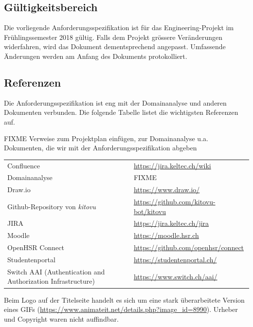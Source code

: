 \documentclass[a4paper]{article}
\def\jiraurl{https://jira.keltec.ch/jira}
\def\confluenceurl{https://jira.keltec.ch/wiki}
\begin{document}
\subsection{Gültigkeitsbereich}
Die vorliegende Anforderungsspezifikation ist für das Engineering-Projekt im Frühlingssemester 2018 gültig. Falls dem Projekt grössere Veränderungen widerfahren, wird das Dokument dementsprechend angepasst. Umfassende Änderungen werden am Anfang des Dokuments protokolliert.

\subsection{Referenzen}


Die Anforderungsspezifikation ist eng mit der Domainanalyse und anderen Dokumenten verbunden. Die folgende Tabelle listet die wichtigsten Referenzen auf.

FIXME Verweise zum Projektplan einfügen, zur Domainanalyse u.a. Dokumenten, die wir mit der Anforderungsspezifikation abgeben

\begin{tabulary}{\linewidth}{ll}
	Confluence & \url{\confluenceurl} \\
	Domainanalyse & FIXME \\
	Draw.io & \url{https://www.draw.io/} \\
	Github-Repository von \emph{kitovu} & \url{https://github.com/kitovu-bot/kitovu} \\
	JIRA	& \url{\jiraurl} \\
	Moodle & \url{https://moodle.hsr.ch} \\
	OpenHSR Connect & \url{https://github.com/openhsr/connect} \\
	Studentenportal & \url{https://studentenportal.ch/} \\
	Switch AAI (Authentication and Authorization Infrastructure)& \url{https://www.switch.ch/aai/} \\
	
\end{tabulary}

Beim Logo auf der Titelseite handelt es sich um eine stark überarbeitete Version eines GIFs (\url{https://www.animateit.net/details.php?image_id=8990}). Urheber und Copyright waren nicht auffindbar.
\end{document}
